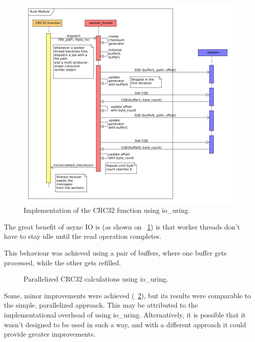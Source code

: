 \begin{figure}[H]
    \centering
    \includegraphics[width=12cm]{figures/checksum/uring_multi_crc}
    \caption{Implementation of the CRC32 function using io\_uring.}
    \label{fig:checksum_fig_8}
\end{figure}

The great benefit of async IO is (as shown on ~\ref{fig:checksum_fig_8}) is that worker threads
don't have to stay idle until the read operation completes.

This behaviour was achieved using a pair of buffers, where one buffer gets processed, while
the other gets refilled.

\begin{figure}[H]
    \centering
    \begin{bchart}[step=50,max=400, unit=s]
        \medskip
        \medskip
        \medskip
        \medskip
    \end{bchart}
    \caption{Parallelized CRC32 calculations using io\_uring.}
    \label{fig:checksum_fig_9}
\end{figure}

Some, minor improvements were achieved (~\ref{fig:checksum_fig_9}), but its results were comparable
to the simple, parallelized approach.
This may be attributed to the implementational overhead of using io\_uring.
Alternatively, it is possible that it wasn't designed to be used in such a way, and with
a different approach it could provide greater improvements.


